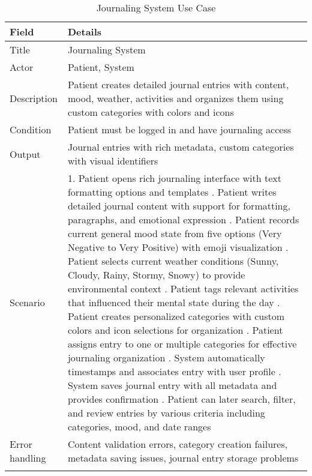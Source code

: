\begin{longtable}{|p{3cm}|p{12cm}|}
\hline
\textbf{Field} & \textbf{Details} \\
\hline
Title & Journaling System \\
\hline
Actor & Patient, System \\
\hline
Description & Patient creates detailed journal entries with content, mood, weather, activities and organizes them using custom categories with colors and icons \\
\hline
Condition & Patient must be logged in and have journaling access \\
\hline
Output & Journal entries with rich metadata, custom categories with visual identifiers \\
\hline
Scenario & 1. Patient opens rich journaling interface with text formatting options and templates \newline 2. Patient writes detailed journal content with support for formatting, paragraphs, and emotional expression \newline 3. Patient records current general mood state from five options (Very Negative to Very Positive) with emoji visualization \newline 4. Patient selects current weather conditions (Sunny, Cloudy, Rainy, Stormy, Snowy) to provide environmental context \newline 5. Patient tags relevant activities that influenced their mental state during the day \newline 6. Patient creates personalized categories with custom colors and icon selections for organization \newline 7. Patient assigns entry to one or multiple categories for effective journaling organization \newline 8. System automatically timestamps and associates entry with user profile \newline 9. System saves journal entry with all metadata and provides confirmation \newline 10. Patient can later search, filter, and review entries by various criteria including categories, mood, and date ranges \\
\hline
Error handling & Content validation errors, category creation failures, metadata saving issues, journal entry storage problems \\
\hline
\caption{Journaling System Use Case}
\end{longtable}

